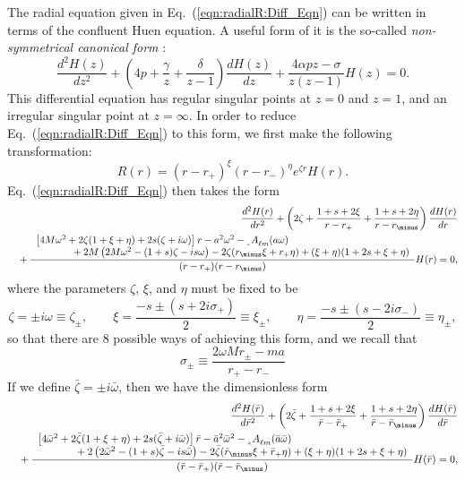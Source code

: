 \documentclass[11pt]{article}
\newcommand{\scA}[4][]{{}_{{}_{#2}}A^{#1}_{#3}(#4)}
\begin{document}
The radial equation given in Eq.~(\ref{eqn:radialR:Diff_Eqn}) can be
written in terms of the confluent Huen equation.  A useful form of it
is the so-called {\em non-symmetrical canonical form} :
\begin{equation}
\frac{d^2H(z)}{dz^2} 
+ \left(4p + \frac\gamma{z}+\frac\delta{z-1}\right)\frac{dH(z)}{dz}
+ \frac{4\alpha pz -\sigma}{z(z-1)}H(z)=0.
\end{equation}
This differential equation has regular singular points at $z=0$ and
$z=1$, and an irregular singular point at $z=\infty$.  In order to
reduce Eq.~(\ref{eqn:radialR:Diff_Eqn}) to this form, we first make
the following transformation:
\begin{equation}
R(r) = (r-r_+)^\xi(r-r_\minus)^\eta e^{\zeta r}H(r).
\end{equation}
Eq.~(\ref{eqn:radialR:Diff_Eqn}) then takes the form
\begin{eqnarray}
&&\frac{d^2H(r)}{dr^2}
+\left(2\zeta +\frac{1+s+2\xi}{r-r_+}+\frac{1+s+2\eta}{r-r_\minus}\right)
\frac{dH(r)}{dr} \\
&&\mbox{}
+\frac{
\begin{array}{l}
\left[4M\omega^2 + 2\zeta(1+\xi+\eta) + 2s(\zeta+i\omega)\right]r
-a^2\omega^2 - \scA{s}{\ell{m}}{a\omega} \\
\mbox{\hspace{0.5in}} + 2M\left(2M\omega^2 - (1+s)\zeta - is\omega\right) 
- 2\zeta(r_\minus\xi + r_+\eta) + (\xi+\eta) (1+2s+\xi+\eta)
\end{array}
}{(r-r_+)(r-r_\minus)}H(r)=0, \nonumber
\end{eqnarray}
where the parameters $\zeta$, $\xi$, and $\eta$ must be fixed to be
\begin{equation}\label{eq:Teukolsky_Heun_parameters}
  \zeta=\pm i\omega\equiv\zeta_\pm,\qquad
  \xi=\frac{-s\pm(s + 2i\sigma_+)}2\equiv\xi_\pm,\qquad
  \eta=\frac{-s\pm(s - 2i\sigma_\minus)}2\equiv\eta_\pm,
\end{equation}
so that there are 8 possible ways of achieving this form, and we recall that
\begin{equation}
 \sigma_\pm\equiv\frac{2\omega{M}r_\pm - ma}{r_+-r_\minus}
\end{equation}
If we define $\bar\zeta=\pm i\bar\omega$, then we have the dimensionless form
\begin{eqnarray}
&&\frac{d^2H(\bar{r})}{d\bar{r}^2}
+\left(2\bar\zeta +\frac{1+s+2\xi}{\bar{r}-\bar{r}_+}
+\frac{1+s+2\eta}{\bar{r}-\bar{r}_\minus}\right)
\frac{dH(\bar{r})}{d\bar{r}} \\
&&\mbox{}
+\frac{
\begin{array}{l}
\left[4\bar\omega^2 + 2\bar\zeta(1+\xi+\eta) 
+ 2s(\bar\zeta+i\bar\omega)\right]\bar{r}
-\bar{a}^2\bar\omega^2 - \scA{s}{\ell{m}}{\bar{a}\bar\omega} \\
\mbox{\hspace{0.5in}} + 2\left(2\bar\omega^2-(1+s)\bar\zeta-is\bar\omega\right) 
- 2\bar\zeta(\bar{r}_\minus\xi + \bar{r}_+\eta) + (\xi+\eta) (1+2s+\xi+\eta)
\end{array}
}{(\bar{r}-\bar{r}_+)(\bar{r}-\bar{r}_\minus)}H(\bar{r})=0, \nonumber
\end{eqnarray}
\end{document}
